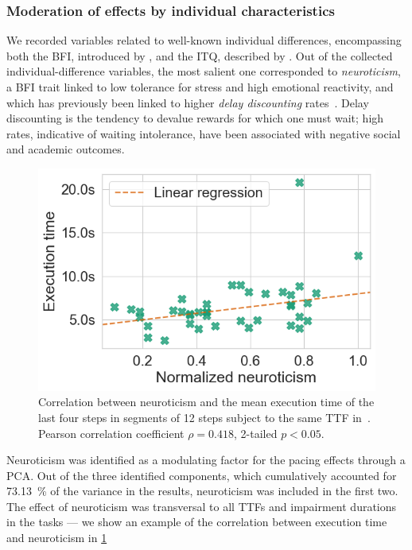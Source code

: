 \subsubsection{Moderation of effects by individual characteristics}\label{ssec:moderationeffects}

We recorded variables related to well-known individual differences, encompassing both the \acf{BFI}, introduced by \textcite{oliver:bfi1999}, and the \acf{ITQ}, described by \textcite{witmer1998measuring}.
Out of the collected individual-difference variables, the most salient one corresponded to \emph{neuroticism}, a \ac{BFI} trait linked to low tolerance for stress and high emotional reactivity, and which has previously been linked to higher \emph{delay discounting} rates~\cite{hirsh2008delay}.
Delay discounting is the tendency to devalue rewards for which one must wait; high rates, indicative of waiting intolerance, have been associated with negative social and academic outcomes.

\begin{figure}
    \centering
    \includegraphics[width=\columnwidth]{figs/new_model/correlation_neuro_exectime.png}
    \caption{%
        Correlation between neuroticism and the mean execution time of the last four steps in segments of \num{12} steps subject to the same \ac{TTF} in~\textcite{olguinmunoz:impact2021}.
        Pearson correlation coefficient \( \rho = 0.418 \), 2-tailed \( p < 0.05 \).
    }\label{fig:neuroexectimecorrel}
\end{figure}

Neuroticism was identified as a modulating factor for the pacing effects through a \ac{PCA}.
Out of the three identified components, which cumulatively accounted for \SI{73.13}{\percent} of the variance in the results, neuroticism was included in the first two.
The effect of neuroticism was transversal to all \acp{TTF} and impairment durations in the tasks --- we show an example of the correlation between execution time and neuroticism in \cref{fig:neuroexectimecorrel}


